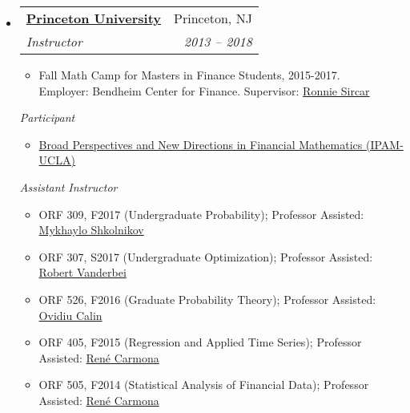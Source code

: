 \documentclass[letterpaper,11pt]{article}
\makeatletter
\newcommand{\resitem}[1]{\item #1 \vspace{-2pt}}
\newenvironment{widetable}[1]
	       {\begin{tabular*}{#1}[t]{l@{\extracolsep{\fill}}r}}
	       {\end{tabular*}}
\newcommand{\ressubheading}[4]{
  \begin{widetable}{\textwidth - 28pt}
		\textbf{#1} & #2 \\
		\textit{#3} & \textit{#4} \\
  \end{widetable}
  \vspace{-12pt}}
\makeatother
\begin{document}
\begin{itemize}[noitemsep,nolistsep,label={}]
\item
  \ressubheading{\href{https://orfe.princeton.edu/courses}{Princeton University}}
		{Princeton, NJ}
		{Instructor}
		{2013 -- 2018}
		\begin{itemize}
			\item Fall Math Camp for Masters in Finance Students, 2015-2017. \\
			Employer: Bendheim Center for Finance. Supervisor: \href{https://www.princeton.edu/~sircar/}{Ronnie Sircar}
		\end{itemize}
		{\emph{Participant}}
		\begin{itemize}
				 \item \href{http://www.ipam.ucla.edu/programs/long-programs/broad-perspectives-and-new-directions-in-financial-mathematics/}{Broad Perspectives and New Directions in Financial Mathematics (IPAM-UCLA)}
		\end{itemize}
		{\emph{Assistant Instructor}}
              	\begin{itemize}
                    \resitem{ORF 309, F2017 (Undergraduate Probability); Professor Assisted: \href{http://www.princeton.edu/~mykhaylo/}{Mykhaylo Shkolnikov}}
                    \resitem{ORF 307, S2017 (Undergraduate Optimization); Professor Assisted: \href{http://www.princeton.edu/~rvdb/}{Robert Vanderbei}}
                    \resitem{ORF 526, F2016 (Graduate Probability Theory); Professor Assisted: \href{https://people.emich.edu/ocalin/Home.htm}{Ovidiu Calin}}
                    \resitem{ORF 405, F2015 (Regression and Applied Time Series); Professor Assisted: \href{https://www.princeton.edu/~rcarmona/}{Ren\'{e} Carmona}}
                    \resitem{ORF 505, F2014 (Statistical Analysis of Financial Data); Professor Assisted: \href{https://www.princeton.edu/~rcarmona/}{Ren\'{e} Carmona}}
               	\end{itemize}


\end{itemize}
\end{document}
